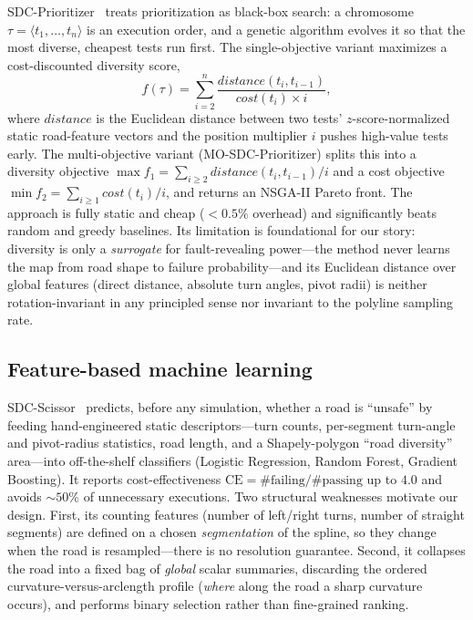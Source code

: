 SDC-Prioritizer~\cite{sdcprio} treats prioritization as black-box search: a
chromosome $\tau=\langle t_1,\dots,t_n\rangle$ is an execution order, and a
genetic algorithm evolves it so that the most diverse, cheapest tests run
first. The single-objective variant maximizes a cost-discounted diversity
score,
\begin{equation}
f(\tau)=\sum_{i=2}^{n}\frac{\mathit{distance}(t_i,t_{i-1})}{\mathit{cost}(t_i)\times i},
\label{eq:sosdc}
\end{equation}
where $\mathit{distance}$ is the Euclidean distance between two tests'
$z$-score-normalized static road-feature vectors and the position multiplier
$i$ pushes high-value tests early. The multi-objective variant
(MO-SDC-Prioritizer) splits this into a diversity objective
$\max f_1=\sum_{i\ge 2}\mathit{distance}(t_i,t_{i-1})/i$ and a cost objective
$\min f_2=\sum_{i\ge 1}\mathit{cost}(t_i)/i$, and returns an NSGA-II Pareto
front. The approach is fully static and cheap ($<0.5\%$ overhead) and
significantly beats random and greedy baselines. Its limitation is
foundational for our story: diversity is only a \emph{surrogate} for
fault-revealing power---the method never learns the map from road shape to
failure probability---and its Euclidean distance over global features
(direct distance, absolute turn angles, pivot radii) is neither
rotation-invariant in any principled sense nor invariant to the polyline
sampling rate.

\subsection{Feature-based machine learning}

SDC-Scissor~\cite{sdcscissor,saner} predicts, before any simulation, whether a
road is ``unsafe'' by feeding hand-engineered static descriptors---turn counts,
per-segment turn-angle and pivot-radius statistics, road length, and a
Shapely-polygon ``road diversity'' area---into off-the-shelf classifiers
(Logistic Regression, Random Forest, Gradient Boosting). It reports
cost-effectiveness $\mathrm{CE}=\#\text{failing}/\#\text{passing}$ up to $4.0$
and avoids $\sim\!50\%$ of unnecessary executions. Two structural weaknesses
motivate our design. First, its counting features (number of left/right turns,
number of straight segments) are defined on a chosen \emph{segmentation} of the
spline, so they change when the road is resampled---there is no resolution
guarantee. Second, it collapses the road into a fixed bag of \emph{global}
scalar summaries, discarding the ordered curvature-versus-arclength profile
(\emph{where} along the road a sharp curvature occurs), and performs binary
selection rather than fine-grained ranking.

